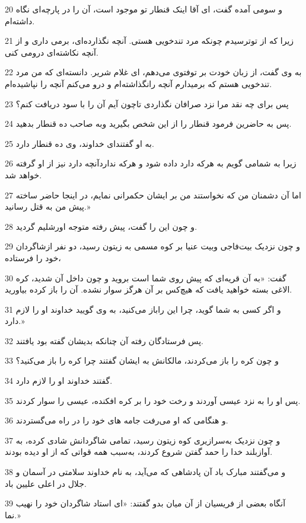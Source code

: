 \par 20 و سومی آمده گفت، ای آقا اینک قنطار تو موجود است، آن را در پارچه‌ای نگاه داشته‌ام.
\par 21 زیرا که از توترسیدم چونکه مرد تندخویی هستی. آنچه نگذارده‌ای، برمی داری و از آنچه نکاشته‌ای درومی کنی.
\par 22 به وی گفت، از زبان خودت بر توفتوی می‌دهم، ای غلام شریر. دانسته‌ای که من مرد تندخویی هستم که برمیدارم آنچه رانگذاشته‌ام و درو می‌کنم آنچه را نپاشیده‌ام.
\par 23 پس برای چه نقد مرا نزد صرافان نگذاردی تاچون آیم آن را با سود دریافت کنم؟
\par 24 پس به حاضرین فرمود قنطار را از این شخص بگیرید وبه صاحب ده قنطار بدهید.
\par 25 به او گفتند‌ای خداوند، وی ده قنطار دارد.
\par 26 زیرا به شمامی گویم به هر‌که دارد داده شود و هر‌که نداردآنچه دارد نیز از او گرفته خواهد شد.
\par 27 اما آن دشمنان من که نخواستند من بر ایشان حکمرانی نمایم، در اینجا حاضر ساخته پیش من به قتل رسانید.»
\par 28 و چون این را گفت، پیش رفته متوجه اورشلیم گردید.
\par 29 و چون نزدیک بیت‌فاجی وبیت عنیا بر کوه مسمی به زیتون رسید، دو نفر ازشاگردان خود را فرستاده،
\par 30 گفت: «به آن قریه‌ای که پیش روی شما است بروید و چون داخل آن شدید، کره الاغی بسته خواهید یافت که هیچ‌کس بر آن هرگز سوار نشده. آن را باز کرده بیاورید.
\par 31 و اگر کسی به شما گوید، چرا این راباز می‌کنید، به وی گویید خداوند او را لازم دارد.»
\par 32 پس فرستادگان رفته آن چنانکه بدیشان گفته بود یافتند.
\par 33 و چون کره را باز می‌کردند، مالکانش به ایشان گفتند چرا کره را باز می‌کنید؟
\par 34 گفتند خداوند او را لازم دارد.
\par 35 پس او را به نزد عیسی آوردند و رخت خود را بر کره افکنده، عیسی را سوار کردند.
\par 36 و هنگامی که او می‌رفت جامه های خود را در راه می‌گستردند.
\par 37 و چون نزدیک به‌سرازیری کوه زیتون رسید، تمامی شاگردانش شادی کرده، به آوازبلند خدا را حمد گفتن شروع کردند، به‌سبب همه قواتی که از او دیده بودند.
\par 38 و می‌گفتند مبارک باد آن پادشاهی که می‌آید، به نام خداوند سلامتی در آسمان و جلال در اعلی علیین باد.
\par 39 آنگاه بعضی از فریسیان از آن میان بدو گفتند: «ای استاد شاگردان خود را نهیب نما.»
